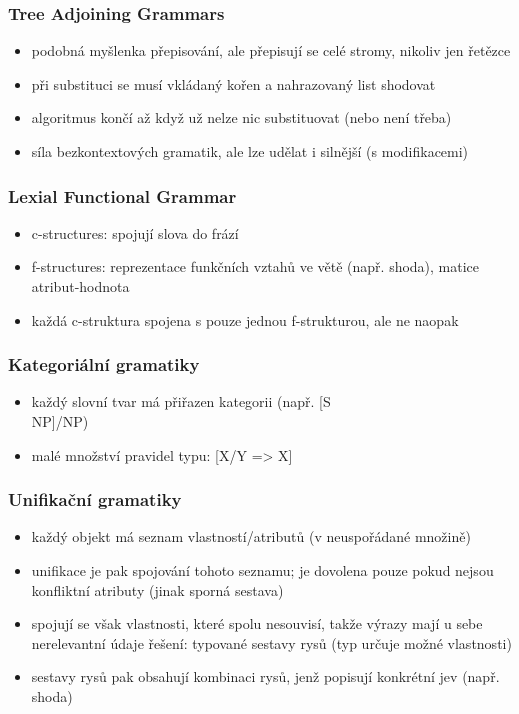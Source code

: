 \documentclass[a4paper]{article}
\newcommand{\tab}{\hspace{1cm}}
\begin{document}
\subsubsection*{Tree Adjoining Grammars}
\begin{itemize}
\item podobná myšlenka přepisování, ale přepisují se celé stromy, nikoliv jen řetězce
\item při substituci se musí vkládaný kořen a nahrazovaný list shodovat
\item algoritmus končí až když už nelze nic substituovat (nebo není třeba)
\item síla bezkontextových gramatik, ale lze udělat i silnější (s modifikacemi)
\end{itemize}

\subsubsection*{Lexial Functional Grammar}
\begin{itemize}
\item c-structures: spojují slova do frází
\item f-structures: reprezentace funkčních vztahů ve větě (např. shoda), matice atribut-hodnota
\item každá c-struktura spojena s pouze jednou f-strukturou, ale ne naopak
\end{itemize}

\subsubsection*{Kategoriální gramatiky}
\begin{itemize}
\item každý slovní tvar má přiřazen kategorii (např. [S\\NP]/NP)
\item malé množství pravidel typu: [X/Y => X]
\end{itemize}

\subsubsection*{Unifikační gramatiky}
\begin{itemize}
\item každý objekt má seznam vlastností/atributů (v neuspořádané množině)
\item unifikace je pak spojování tohoto seznamu; je dovolena pouze pokud nejsou konfliktní atributy (jinak sporná sestava)
\item spojují se však vlastnosti, které spolu nesouvisí, takže výrazy mají u sebe nerelevantní údaje
\text{} \tab řešení: typované sestavy rysů (typ určuje možné vlastnosti)
\item sestavy rysů pak obsahují kombinaci rysů, jenž popisují konkrétní jev (např. shoda)
\end{itemize}
\end{document}
